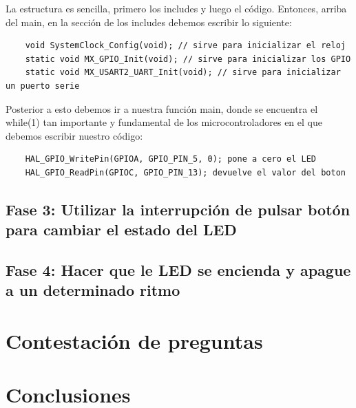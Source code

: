 \documentclass[11pt,a4paper]{article}
\begin{document}
	La estructura es sencilla, primero los includes y luego el código. Entonces, arriba del main, en la sección de los includes debemos escribir lo siguiente:
	\begin{lstlisting}
	void SystemClock_Config(void); // sirve para inicializar el reloj
	static void MX_GPIO_Init(void); // sirve para inicializar los GPIO
	static void MX_USART2_UART_Init(void); // sirve para inicializar un puerto serie
	\end{lstlisting}
	
	Posterior a esto debemos ir a nuestra función main, donde se encuentra el while(1) tan importante y fundamental de los microcontroladores en el que debemos escribir nuestro código:
	\begin{lstlisting}
	HAL_GPIO_WritePin(GPIOA, GPIO_PIN_5, 0); pone a cero el LED
	HAL_GPIO_ReadPin(GPIOC, GPIO_PIN_13); devuelve el valor del boton
	\end{lstlisting}

	
	
	\subsection{Fase 3: Utilizar la interrupción de pulsar botón para cambiar el estado del LED}
	
	\subsection{Fase 4: Hacer que le LED se encienda y apague a un determinado ritmo}
	
	\section{Contestación de preguntas}


	\section{Conclusiones}
\end{document}
